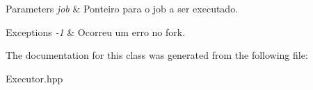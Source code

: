 \begin{DoxyParams}{Parameters}
{\em job} & Ponteiro para o job a ser executado. \\
\hline
\end{DoxyParams}

\begin{DoxyExceptions}{Exceptions}
{\em -\/1} & Ocorreu um erro no fork. \\
\hline
\end{DoxyExceptions}


The documentation for this class was generated from the following file:\begin{DoxyCompactItemize}
\item 
Executor.hpp\end{DoxyCompactItemize}
